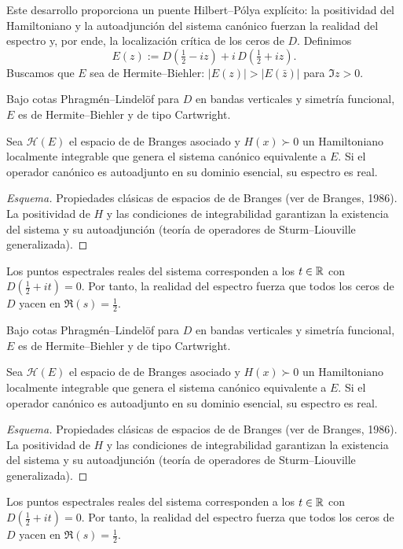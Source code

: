 Este desarrollo proporciona un puente Hilbert--Pólya explícito: la positividad
del Hamiltoniano y la autoadjunción del sistema canónico fuerzan la realidad del
espectro y, por ende, la localización crítica de los ceros de $D$.
Definimos
\[
E(z):=D\!\left(\tfrac{1}{2}-iz\right)+i\,D\!\left(\tfrac{1}{2}+iz\right).
\]
Buscamos que $E$ sea de Hermite--Biehler: $|E(z)|>|E(\bar z)|$ para $\Im z>0$.

\begin{lemmaC}
Bajo cotas Phragm\'en--Lindel\"of para $D$ en bandas verticales y simetr\'ia funcional,
$E$ es de Hermite--Biehler y de tipo Cartwright.
\end{lemmaC}

\begin{theoremC}
Sea $\mathcal{H}(E)$ el espacio de de Branges asociado y $H(x)\succ 0$ un Hamiltoniano
localmente integrable que genera el sistema can\'onico equivalente a $E$.
Si el operador can\'onico es autoadjunto en su dominio esencial, su espectro es real.
\end{theoremC}

\begin{proof}[Esquema]
Propiedades cl\'asicas de espacios de de Branges (ver de Branges, 1986).
La positividad de $H$ y las condiciones de integrabilidad garantizan la existencia del
sistema y su autoadjunci\'on (teor\'ia de operadores de Sturm--Liouville generalizada).
\end{proof}

\begin{propC}
Los puntos espectrales reales del sistema corresponden a los $t\in\Bbb R$ con
$D(\tfrac{1}{2}+it)=0$. Por tanto, la realidad del espectro fuerza que todos los ceros
de $D$ yacen en $\Re(s)=\tfrac{1}{2}$.
\end{propC}
\begin{lemma}
Bajo cotas Phragmén--Lindelöf para $D$ en bandas verticales y simetría funcional,
$E$ es de Hermite--Biehler y de tipo Cartwright.
\end{lemma}

\begin{theorem}
Sea $\mathcal{H}(E)$ el espacio de de Branges asociado y $H(x)\succ 0$ un Hamiltoniano
localmente integrable que genera el sistema canónico equivalente a $E$.
Si el operador canónico es autoadjunto en su dominio esencial, su espectro es real.
\end{theorem}

\begin{proof}[Esquema]
Propiedades clásicas de espacios de de Branges (ver de Branges, 1986).
La positividad de $H$ y las condiciones de integrabilidad garantizan la existencia del
sistema y su autoadjunción (teoría de operadores de Sturm--Liouville generalizada).
\end{proof}

\begin{prop}
Los puntos espectrales reales del sistema corresponden a los $t\in\Bbb R$ con
$D(\tfrac{1}{2}+it)=0$. Por tanto, la realidad del espectro fuerza que todos los ceros
de $D$ yacen en $\Re(s)=\tfrac{1}{2}$.
\end{prop}
